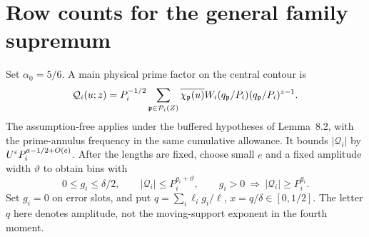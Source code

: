 \section{Row counts for the general family supremum}\label{sec:count}
Set $\alpha_0=5/6$. A main physical prime factor on the central contour is
\[
 \mathcal Q_i(u;z)=P_i^{-1/2}\sum_{\mathfrak p\in\mathcal P_i(Z)}
 \overline{\chi_\mathfrak p(u)}W_i(q_\mathfrak p/P_i)(q_\mathfrak p/P_i)^{z-1}.
\]
The assumption-free  applies under the buffered hypotheses of Lemma~8.2, with the prime-annulus frequency in the same cumulative allowance. It bounds $|\mathcal Q_i|$ by $U^\varepsilon P_i^{a-1/2+O(e)}$. After the lengths are fixed, choose small $e$ and a fixed amplitude width $\vartheta$ to obtain bins with
\[
 0\le g_i\le\delta/2,\qquad
 |\mathcal Q_i|\le P_i^{g_i+\vartheta},\qquad
 g_i>0\ \Longrightarrow\ |\mathcal Q_i|\ge P_i^{g_i}.
\]
Set $g_i=0$ on error slots, and put $q=\sum_i\ell_i g_i/\ell$, $x=q/\delta\in[0,1/2]$. The letter $q$ here denotes amplitude, not the moving-support exponent in the fourth moment.

